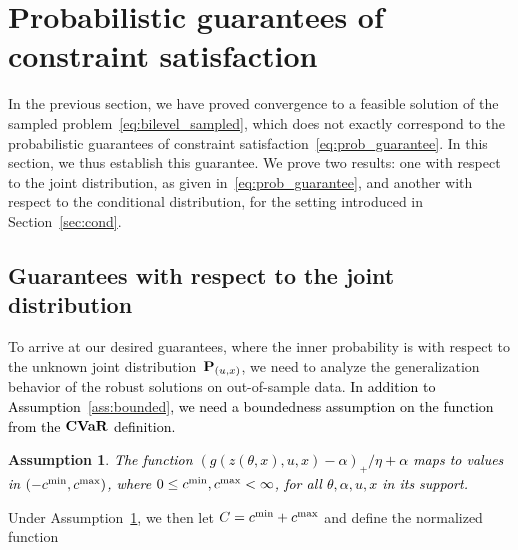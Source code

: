 \documentclass[11pt]{article}
\newtheorem{assumption}{Assumption}
\newtheorem{assumption}{Assumption}[section]
\newcommand{\bsnote}[1]{\noindent\textcolor{red}{\texttt{Bartolomeo: #1}}}
\newcommand{\RC}[1]{\textcolor{black}{#1}}
\begin{document}
\section{Probabilistic guarantees of constraint satisfaction}
\label{sec:guarantees}
In the previous section, we have proved convergence to a feasible solution of the sampled problem~\eqref{eq:bilevel_sampled}, which does not exactly correspond to the probabilistic guarantees of constraint satisfaction~\eqref{eq:prob_guarantee}. 
In this section, we thus establish this guarantee. We prove two results: one with respect to the joint distribution, as given in~\eqref{eq:prob_guarantee}, and another with respect to the conditional distribution, for the setting introduced in Section~\ref{sec:cond}.

\subsection{Guarantees with respect to the joint distribution}
To arrive at our desired guarantees, where the inner probability is with respect to the unknown joint distribution~\RC{${\mathbf P}_{(u,x)}$}, we need to analyze the generalization behavior of the robust solutions on out-of-sample data. 
\RC{In addition to Assumption~\ref{ass:bounded}, we need a boundedness assumption on the function from the $\mathop{\bf CVaR}$ definition.}
\begin{assumption}
  \label{assup:bound_range} \RC{The function $(g(z(\theta,x),u,x)- \alpha)_+/\eta + \alpha$ maps to values in  $(-c^{\rm min}, c^{\rm max})$, where $0 \leq c^{\rm min}, c^{\rm max} < \infty$, for all $\theta,\alpha,u,x$ in its support.}
\end{assumption}
Under Assumption~\ref{assup:bound_range}, we then let $C = c^{\rm min} + c^{\rm max}$ and define the normalized function
\end{document}

